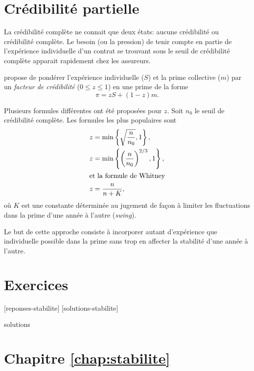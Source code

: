 \section{Crédibilité partielle}
\label{sec:stabilite:partielle}

La crédibilité complète ne connait que deux états: aucune crédibilité
ou crédibilité complète. Le besoin (ou la pression) de tenir compte en
partie de l'expérience individuelle d'un contrat se trouvant sous le
seuil de crédibilité complète apparait rapidement chez les assureurs.

\cite{Whitney:1918} propose de pondérer l'expérience individuelle
($S$) et la prime collective ($m$) par un \emph{facteur de
  crédibilité} ($0 \leq z \leq 1$) en une prime de la forme
\begin{displaymath}
  \pi = z S + (1 - z) m.
\end{displaymath}

Plusieurs formules différentes ont été proposées pour $z$. Soit $n_0$
le seuil de crédibilité complète. Les formules les plus populaires
sont
\begin{align*}
  z &= \min \left\{ \sqrt{\frac{n}{n_0}}, 1 \right\}, \\
  z &= \min \left\{ \left( \frac{n}{n_0} \right)^{2/3}, 1 \right\}, \\
  \intertext{et la formule de Whitney}
  z &= \frac{n}{n + K},
\end{align*}
où $K$ est une constante déterminée au jugement de façon à limiter les
fluctuations dans la prime d'une année à l'autre (\emph{swing}).

Le but de cette approche consiste à incorporer autant d'expérience que
individuelle possible dans la prime sans trop en affecter la stabilité
d'une année à l'autre.



\section{Exercices}
\label{sec:stabilite:exercices}

[reponses-stabilite]
[solutions-stabilite]

\begin{Filesave}{solutions}
\section*{Chapitre \ref*{chap:stabilite}}

\end{Filesave}

